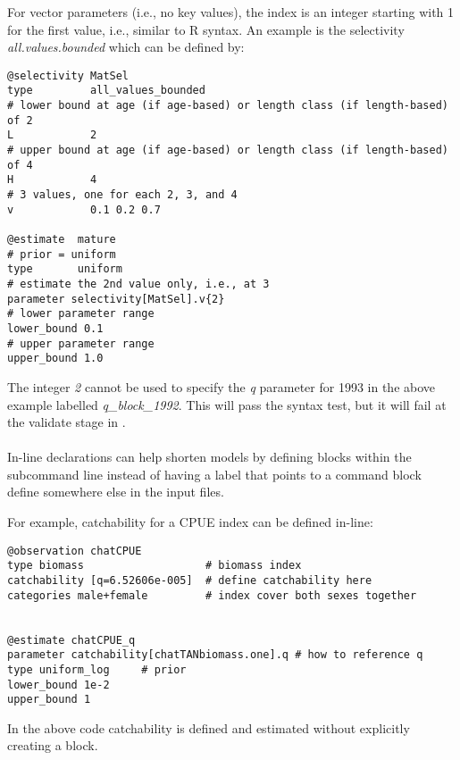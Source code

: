 For vector parameters (i.e., no key values), the index is an integer starting with 1 for the first value, i.e., similar to R syntax. An example is the selectivity \textit{all.values.bounded} which can be defined by:

{\small{\begin{verbatim}
@selectivity MatSel
type         all_values_bounded
# lower bound at age (if age-based) or length class (if length-based) of 2
L            2
# upper bound at age (if age-based) or length class (if length-based) of 4
H            4
# 3 values, one for each 2, 3, and 4
v            0.1 0.2 0.7

@estimate  mature
# prior = uniform
type       uniform
# estimate the 2nd value only, i.e., at 3
parameter selectivity[MatSel].v{2}
# lower parameter range
lower_bound 0.1
# upper parameter range
upper_bound 1.0
\end{verbatim}}}

The integer \textit{{2}} cannot be used to specify the \textit{q} parameter for 1993 in the above example labelled \textit{q\_block\_1992}. This will pass the syntax test, but it will fail at the validate stage in \CNAME.


\paragraph*{\label{sec:declare}}

In-line declarations can help shorten models by defining \command{} blocks within the subcommand line instead of having a label that points to a command block define somewhere else in the input files.

For example, catchability for a CPUE index can be defined in-line:

{\small{\begin{verbatim}
@observation chatCPUE
type biomass                   # biomass index
catchability [q=6.52606e-005]  # define catchability here
categories male+female         # index cover both sexes together


@estimate chatCPUE_q
parameter catchability[chatTANbiomass.one].q # how to reference q
type uniform_log     # prior
lower_bound 1e-2
upper_bound 1
\end{verbatim}}}

In the above code catchability is defined and estimated without explicitly creating a  block.


